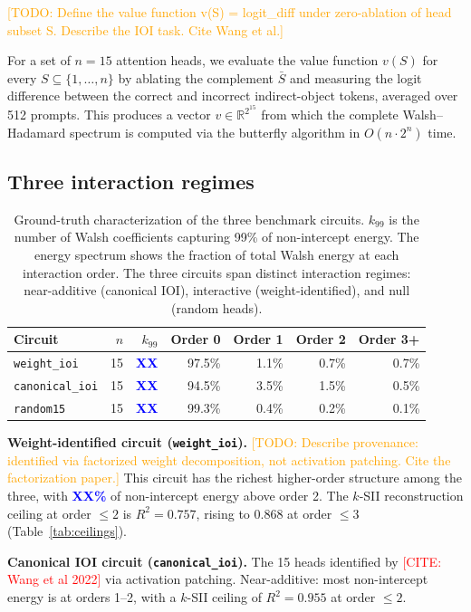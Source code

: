 \documentclass[11pt]{article}
\newcommand{\citeneeded}[1]{\textcolor{red}{[CITE: #1]}}
\newcommand{\todo}[1]{\textcolor{orange}{[TODO: #1]}}
\newcommand{\numplaceholder}[1]{\textcolor{blue}{\textbf{#1}}}
\begin{document}
\todo{Define the value function v(S) = logit\_diff under zero-ablation
of head subset S. Describe the IOI task. Cite Wang et al.}

For a set of $n = 15$ attention heads, we evaluate the value function
$v(S)$ for every $S \subseteq \{1, \ldots, n\}$ by ablating the
complement $\bar{S}$ and measuring the logit difference between the
correct and incorrect indirect-object tokens, averaged over 512 prompts.
This produces a vector $v \in \mathbb{R}^{2^{15}}$ from which the
complete Walsh--Hadamard spectrum is computed via the butterfly algorithm
in $O(n \cdot 2^n)$ time.

\subsection{Three interaction regimes}

\begin{table}[t]
\centering
\caption{Ground-truth characterization of the three benchmark circuits.
$k_{99}$ is the number of Walsh coefficients capturing 99\% of
non-intercept energy. The energy spectrum shows the fraction of total
Walsh energy at each interaction order. The three circuits span distinct
interaction regimes: near-additive (canonical IOI), interactive
(weight-identified), and null (random heads).}
\label{tab:circuits}
\begin{tabular}{lrrrrrr}
\toprule
Circuit & $n$ & $k_{99}$ & Order 0 & Order 1 & Order 2 & Order 3+ \\
\midrule
\texttt{weight\_ioi} & 15 & \numplaceholder{XX} & 97.5\% & 1.1\% & 0.7\% & 0.7\% \\
\texttt{canonical\_ioi} & 15 & \numplaceholder{XX} & 94.5\% & 3.5\% & 1.5\% & 0.5\% \\
\texttt{random15} & 15 & \numplaceholder{XX} & 99.3\% & 0.4\% & 0.2\% & 0.1\% \\
\bottomrule
\end{tabular}
\end{table}

\textbf{Weight-identified circuit (\texttt{weight\_ioi}).}
\todo{Describe provenance: identified via factorized weight decomposition,
not activation patching. Cite the factorization paper.}
This circuit has the richest higher-order structure among the three,
with \numplaceholder{XX\%} of non-intercept energy above order 2.
The $k$-SII reconstruction ceiling at order $\leq 2$ is $R^2 = 0.757$,
rising to $0.868$ at order $\leq 3$ (Table~\ref{tab:ceilings}).

\textbf{Canonical IOI circuit (\texttt{canonical\_ioi}).}
The 15 heads identified by \citeneeded{Wang et al 2022} via activation
patching. Near-additive: most non-intercept energy is at orders 1--2,
with a $k$-SII ceiling of $R^2 = 0.955$ at order $\leq 2$.
\end{document}
